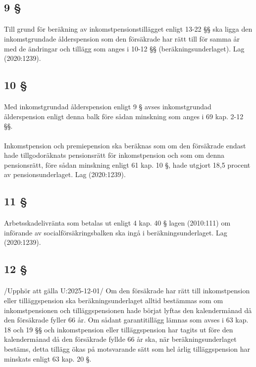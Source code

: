 \documentclass[a4paper,notitlepage,openany,10pt]{book}
\begin{document}
\subsection*{9 §}
\paragraph*{}
Till grund för beräkning av inkomstpensionstillägget enligt 13-22 §§ ska ligga den inkomstgrundade ålderspension som den försäkrade har rätt till för samma år med de ändringar och tillägg som anges i 10-12 §§ (beräkningsunderlaget).
Lag (2020:1239).
\subsection*{10 §}
\paragraph*{}
Med inkomstgrundad ålderspension enligt 9 § avses inkomstgrundad ålderspension enligt denna balk före sådan minskning som anges i 69 kap. 2-12 §§.
\paragraph*{}
Inkomstpension och premiepension ska beräknas som om den försäkrade endast hade tillgodoräknats pensionsrätt för inkomstpension och som om denna pensionsrätt, före sådan minskning enligt 61 kap. 10 §, hade utgjort 18,5 procent av pensionsunderlaget.
Lag (2020:1239).
\subsection*{11 §}
\paragraph*{}
Arbetsskadelivränta som betalas ut enligt 4 kap. 40 § lagen (2010:111) om införande av socialförsäkringsbalken ska ingå i beräkningsunderlaget.
Lag (2020:1239).
\subsection*{12 §}
\paragraph*{}
/Upphör att gälla U:2025-12-01/
Om den försäkrade har rätt till inkomstpension eller tilläggspension ska beräkningsunderlaget alltid bestämmas som om inkomstpensionen och tilläggspensionen hade börjat lyftas den kalendermånad då den försäkrade fyller 66 år. Om sådant garantitillägg lämnas som avses i 63 kap. 18 och 19 §§ och inkomstpension eller tilläggspension har tagits ut före den kalendermånad då den försäkrade fyllde 66 år ska, när beräkningsunderlaget bestäms, detta tillägg ökas på motsvarande sätt som hel årlig tilläggspension har minskats enligt 63 kap. 20 §.
\end{document}

